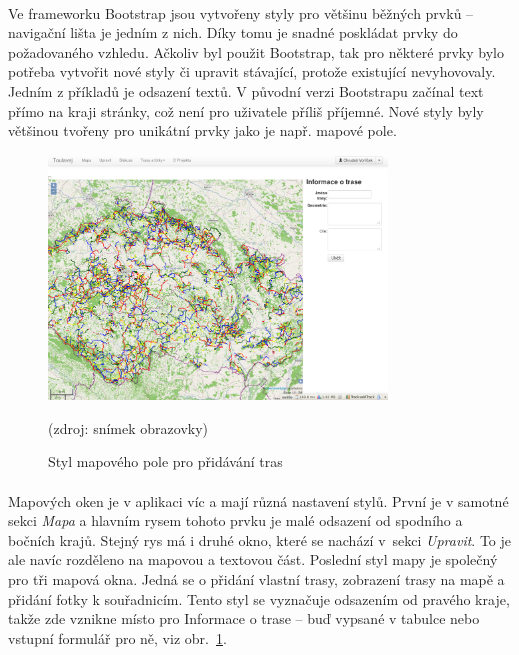 \documentclass[11pt,a4paper,titlepage,oneside]{book}
\begin{document}
			\paragraph{} Ve frameworku Bootstrap jsou vytvořeny styly pro většinu běžných prvků -- navigační lišta je jedním z nich. Díky tomu je snadné poskládat prvky do požadovaného vzhledu. Ačkoliv byl použit Bootstrap, tak pro některé prvky bylo potřeba vytvořit nové styly či upravit stávající, protože existující nevyhovovaly. Jedním z příkladů je odsazení textů. V původní verzi Bootstrapu začínal text přímo na kraji stránky, což není pro uživatele příliš příjemné. Nové styly byly většinou tvořeny pro unikátní prvky jako je např. mapové pole.
		\begin{figure}[!h]
			\begin{center}
				\includegraphics[width=9cm]{obrazky/toulavej/addTrack.png}
				\caption{Styl mapového pole pro přidávání tras}
				\label{fig:addTrack}
				(zdroj: snímek obrazovky)
			\end{center}
		\end{figure}	
			\paragraph{} Mapových oken je v aplikaci víc a mají různá nastavení stylů. První je v samotné sekci \textit{Mapa} a hlavním rysem tohoto prvku je malé odsazení od spodního a bočních krajů. Stejný rys má i druhé okno, které se nachází v~sekci \textit{Upravit}. To je ale navíc rozděleno na mapovou a textovou část. Poslední styl mapy je společný pro tři mapová okna. Jedná se o přidání vlastní trasy, zobrazení trasy na mapě a přidání fotky k souřadnicím. Tento styl se vyznačuje odsazením od pravého kraje, takže zde vznikne místo pro Informace o trase -- buď vypsané v tabulce nebo vstupní formulář pro ně, viz obr.~\ref{fig:addTrack}.
\end{document}
